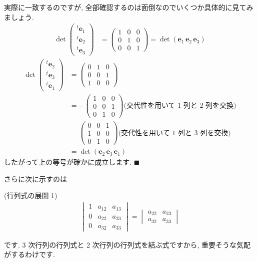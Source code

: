 \documentclass[openany, a4paper, oneside]{jsbook}
\begin{document}
実際に一致するのですが, 全部確認するのは面倒なのでいくつか具体的に見てみましょう.
\begin{align}
    \det \begin{pmatrix} ^{t}\bm{e}_{1} \\ ^{t}\bm{e}_{2} \\ ^{t}\bm{e}_{3} \end{pmatrix}
    &= \begin{pmatrix} 1 & 0 & 0 \\
                      0 & 1 & 0 \\
                      0 & 0 & 1
      \end{pmatrix}
    =
    \det \left ( \bm{e}_{1} \, \bm{e}_{2} \, \bm{e}_{3} \right)
\end{align}
\begin{align}
    \det \begin{pmatrix} ^{t}\bm{e}_{2} \\ ^{t}\bm{e}_{3} \\ ^{t}\bm{e}_{1} \end{pmatrix}
    &= \begin{pmatrix} 0 & 1 & 0 \\
                      0 & 0 & 1 \\
                      1 & 0 & 0
      \end{pmatrix} \\
    &= - \begin{pmatrix} 1 & 0 & 0 \\
                        0 & 0 & 1 \\
                        0 & 1 & 0
      \end{pmatrix} \text{(交代性を用いて 1 列と 2 列を交換)} \\
    &= \begin{pmatrix} 0 & 0 & 1 \\
                      1 & 0 & 0 \\
                      0 & 1 & 0
      \end{pmatrix} \text{(交代性を用いて 1 列と 3 列を交換)} \\
    &=
    \det \left ( \bm{e}_{2} \, \bm{e}_{3} \, \bm{e}_{1} \right)
\end{align}
したがって上の等号が確かに成立します.  $\blacksquare$

さらに次に示すのは
\begin{thm}(行列式の展開 1)
\begin{align}
    \begin{vmatrix} 1 & a_{12} & a_{13} \\
                    0 & a_{22} & a_{23} \\
                    0 & a_{32} & a_{33}
    \end{vmatrix}
    =
    \begin{vmatrix} a_{22} & a_{23} \\
                    a_{32} & a_{33}
    \end{vmatrix}
\end{align}
\end{thm}
です. 3 次行列の行列式と 2 次行列の行列式を結ぶ式ですから, 重要そうな気配がするわけです.
\end{document}
